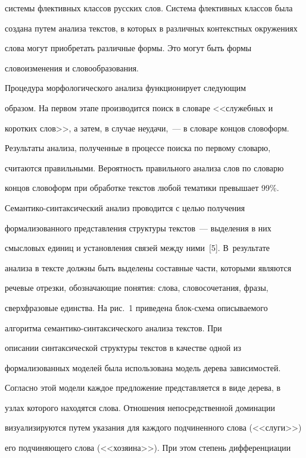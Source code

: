 системы флективных классов русских слов. Система флективных классов была 

создана путем анализа текстов, в которых в различных контекстных окружениях 

слова могут приобретать различные формы. Это могут быть формы 

словоизменения и словообразования. 

     

     Процедура морфологического анализа функционирует следующим 

образом. На первом этапе производится поиск в словаре <<служебных и 

коротких слов>>, а затем, в случае неудачи,~--- в словаре концов словоформ. 

Результаты анализа, полученные в процессе поиска по первому словарю, 

считаются правильными. Вероятность правильного анализа слов по словарю 

концов словоформ при обработке текстов любой тематики превышает 99\%.

     

     Семантико-синтаксический анализ проводится с целью получения 

формализованного представления структуры текстов~--- выделения в них 

смысловых единиц и установления связей между ними~[5]. В~результате 

анализа в тексте должны быть выделены составные части, которыми являются 

речевые отрезки, обозначающие понятия: слова, словосочетания, фразы, 

сверхфразовые единства. На рис.~1 приведена блок-схе\-ма описываемого 

алгоритма се\-ман\-ти\-ко-син\-так\-си\-че\-ско\-го анализа текстов. При 

описании синтаксической структуры текстов в качестве одной из 

формализованных моделей была использована модель дерева зависимостей. 

Согласно этой модели каждое предложение представляется в виде дерева, в 

узлах которого находятся слова. Отношения непосредственной доминации 

визуализируются путем указания для каждого подчиненного слова (<<слуги>>) 

его подчиняющего слова (<<хозяина>>). При этом степень дифференциации 

